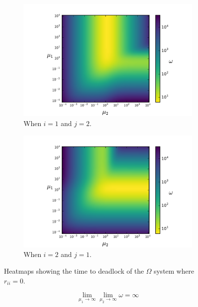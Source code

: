 \documentclass{article}
\begin{document}
\begin{figure}[htbp!]
	\begin{center}
	  \begin{subfigure}{0.45\textwidth}
		\includegraphics[width=\textwidth]{images/r12r21r22.pdf}
		\caption{When $i = 1$ and $j = 2$.}
	  \end{subfigure}
	  \begin{subfigure}{0.45\textwidth}
		\includegraphics[width=\textwidth]{images/r11r12r21.pdf}
		\caption{When $i = 2$ and $j = 1$.}
	  \end{subfigure}
	\end{center}
	\caption{Heatmaps showing the time to deadlock of the $\Omega$ system where $r_{ii} = 0$.}
	\label{fig:rijrjirjj}
\end{figure}

\begin{equation}\label{eqn:r11_inf}
\lim_{\mu_1 \to \infty} \lim_{\mu_2 \to \infty} \omega = \infty
\end{equation}
\end{document}
